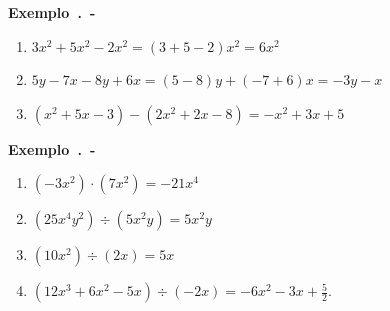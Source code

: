 \textbf{Exemplo~\thesubsection.\theexemplo~-}
\settowidth{}
\begin{description}[leftmargin=\dimexpr\widest+\labelsep\relax,labelindent=0pt,
    labelwidth=\widest]
\item[]

\begin{enumerate}[label=(\alph*)]
    \item $3x^2 + 5x^2 - 2x^2 = (3+5-2)x^2 = 6x^2$
    \item $5y - 7x - 8y + 6x = (5-8)y + (-7+6)x = -3y - x$
    \item $(x^2 + 5x -3) - ( 2x^2 + 2x -8) = -x^2 + 3x + 5$
\end{enumerate}

\end{description}

\begin{center}\end{center}

\textbf{Exemplo~\thesubsection.\theexemplo~-}
\settowidth{}
\begin{description}[leftmargin=\dimexpr\widest+\labelsep\relax,labelindent=0pt,
    labelwidth=\widest]
\item[]

\begin{enumerate}[label=(\alph*)]
    \item $(-3x^2 ) \cdot (7x^2) = -21x^4$
    \item $(25x^4 y^2) \div (5x^2 y) = 5x^2y$
    \item $(10x^2) \div (2x) = 5x$
    \item $(12x^3 + 6x^2 - 5x) \div (-2x) = -6x^2 - 3x + \frac{5}{2}$.   

\end{enumerate}
\end{description}

